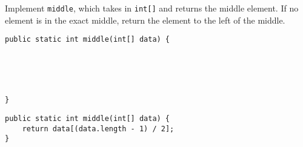 \begin{blocksection}
\question Implement \lstinline$middle$, which takes in \lstinline$int[]$ and
returns the middle element. If no element is in the exact middle, return the
element to the left of the middle.

\ifprintanswers\else
\begin{lstlisting}
public static int middle(int[] data) {





}
\end{lstlisting}
\fi

\begin{solution}
\begin{lstlisting}
public static int middle(int[] data) {
    return data[(data.length - 1) / 2];
}
\end{lstlisting}
\end{solution}
\end{blocksection}
